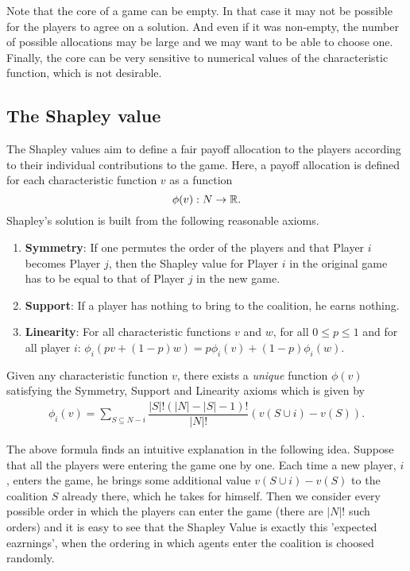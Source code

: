 Note that the core of a game can be empty. In that case it may not be possible for the players to agree on a solution. And even if it was non-empty, the number of possible allocations may be large and we may want to be able to choose one. Finally, the core can be very sensitive to numerical values of the characteristic function, which is not desirable. 


\subsection{The Shapley value}



The Shapley values aim to define a fair payoff allocation to the players according to their individual contributions to the game. Here, a payoff allocation is defined for each characteristic function $v$ as a function $$\phi(v) : N \rightarrow \mathbb{R}.$$ 
Shapley's solution is built from the following reasonable axioms. 

\begin{enumerate}
	\item \textbf{Symmetry}: If one permutes the order of the players and that Player $i$ becomes Player $j$, then the Shapley value for Player $i$ in the original game has to be equal to that of Player $j$ in the new game.
	\item \textbf{Support}: If a player has nothing to bring to the coalition, he earns nothing.
	\item \textbf{Linearity}: For all characteristic functions $v$ and $w$, for all $0 \leq p \leq 1$ and for all player $i$: $\phi_i(pv + (1-p)w) = p\phi_i(v) + (1-p)\phi_i(w)$.
\end{enumerate}

\begin{theorem}
Given any characteristic function $v$, there exists a \emph{unique} function $\phi(v)$ satisfying the Symmetry, Support and Linearity axioms which is given by
\begin{align*}
	\phi_i(v) = \sum_{S \subseteq N -i}{\dfrac{|S|!(|N| - |S| - 1)!}{|N|!} (v(S \cup {i}) - v(S))}.
\end{align*}
\end{theorem}


The above formula finds an intuitive explanation in the following idea. Suppose that all the players were entering the game one by one. Each time a new player, $i$, enters the game, he brings some additional value $v(S \cup {i}) - v(S)$ to the coalition $S$ already there, which he takes for himself. Then we consider every possible order in which the players can enter the game (there are $|N|!$ such orders) and it is easy to see that the Shapley Value is exactly this 'expected eazrnings', when the ordering in which agents enter the coalition is choosed randomly.



\ifx \globalmark \undefined %


	
\else 
	
\fi
